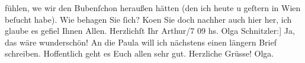 \begin{ledgroupsized}[t]{13cm}
               fühlen, we{\geminationn} wir den Bubenſchon heraußen hätten (den ich heute u geſtern in
                  Wien beſucht habe).\pend
           \pstart
           Wie behagen Sie ſich? Ko{\geminationm}en Sie doch nachher auch hier
               her, ich glaube es gefiel Ihnen Allen.\pend
           \pstart Herzlichſt Ihr \spacefill\mbox{Arthur}\pend{}/7 09\pend
           \pstart
           \noindent{}{[}hs. Olga Schnitzler:{]} Ja, das wäre wunderschön! An die Paula will ich nächstens einen längern Brief schreiben.
               Hoffentlich geht es Euch allen sehr gut.\pend
           \pstart Herzliche Grüsse! \spacefill\mbox{Olga.}\pend{}
         
         \endnumbering{}\end{ledgroupsized}  \newcommand{\dateiname}{L01853}\newcommand{\titel}{Arthur und Olga Schnitzler an Richard Beer-Hofmann, 6. 7. 1909}\newcommand{\editorInnen}{Martin Anton Müller und Gerd-Hermann Susen}
      